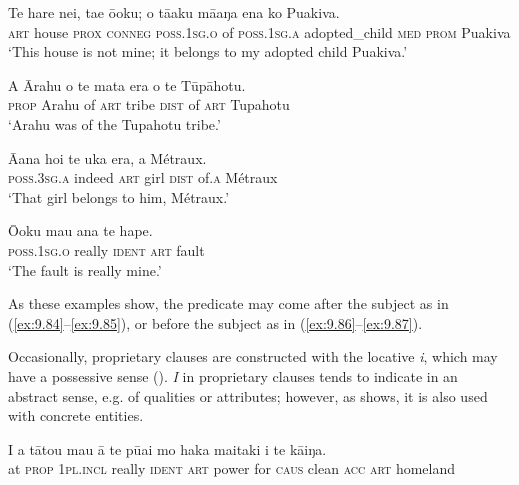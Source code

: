 \ea\label{ex:9.84}
\gll Te hare nei, ta{\ꞌ}e ō{\ꞌ}oku; o tā{\ꞌ}aku mā{\ꞌ}aŋa ena ko Puakiva. \\
\textsc{art} house \textsc{prox} \textsc{conneg} \textsc{poss.1sg.o} of \textsc{poss.1sg.a} adopted\_child \textsc{med} \textsc{prom} Puakiva \\

\glt 
‘This house is not mine; it belongs to my adopted child Puakiva.’ \textstyleExampleref{[R229.268]} 
\z

\ea\label{ex:9.85}
\gll A {\ꞌ}Ārahu o te mata era o te Tūpāhotu. \\
\textsc{prop} Arahu of \textsc{art} tribe \textsc{dist} of \textsc{art} Tupahotu \\

\glt 
‘Arahu was of the Tupahotu tribe.’ \textstyleExampleref{[R432.002]} 
\z

\ea\label{ex:9.86}
\gll {\ꞌ}Ā{\ꞌ}ana ho{\ꞌ}i te uka era, {\ꞌ}a Métraux. \\
\textsc{poss.3sg.a} indeed \textsc{art} girl \textsc{dist} of\textsc{.a} Métraux \\

\glt 
‘That girl belongs to him, Métraux.’ \textstyleExampleref{[R416.813]} 
\z

\ea\label{ex:9.87}
\gll Ō{\ꞌ}oku mau {\ꞌ}ana te hape. \\
\textsc{poss.1sg.o} really \textsc{ident} \textsc{art} fault \\

\glt
‘The fault is really mine.’ \textstyleExampleref{[R236.095]} 
\z

As these examples show, the predicate may come after the subject as in (\ref{ex:9.84}–\ref{ex:9.85}), or before the subject as in (\ref{ex:9.86}–\ref{ex:9.87}).

Occasionally, proprietary clauses are constructed with the locative  \textit{i}, which may have a possessive sense (). \textit{I} in proprietary clauses tends to indicate  in an abstract sense, e.g.  of qualities or attributes; however, as  shows, it is also used with concrete entities.

\ea\label{ex:9.88}
\gll I a tātou mau {\ꞌ}ā te pūai mo haka ma{\ꞌ}itaki i te kāiŋa. \\
at \textsc{prop} \textsc{1pl.incl} really \textsc{ident} \textsc{art} power for \textsc{caus} clean \textsc{acc} \textsc{art} homeland \\

